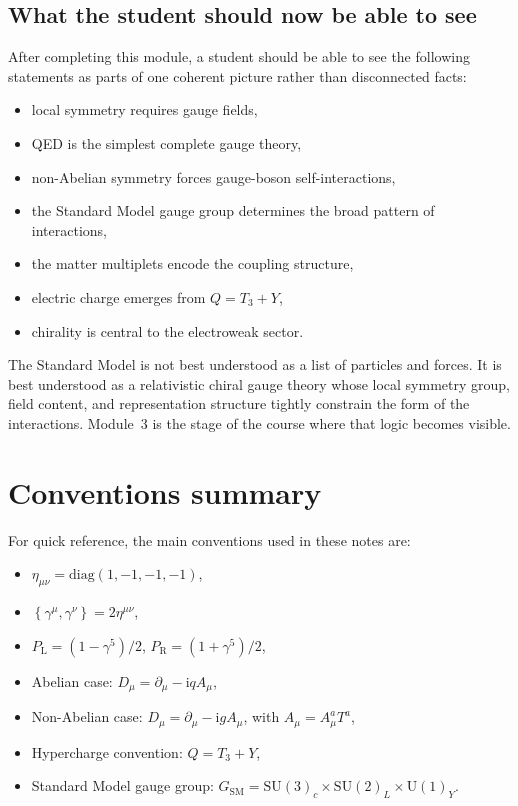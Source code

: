 \documentclass[11pt,a4paper]{article}
\newcommand{\ii}{\mathrm{i}}
\newcommand{\p}{\partial}
\newcommand{\diag}{\mathrm{diag}}
\newcommand{\acomm}[2]{\left\{#1,#2\right\}}
\newcommand{\PL}{P_{\mathrm{L}}}
\newcommand{\PR}{P_{\mathrm{R}}}
\newcommand{\SMgauge}{\mathrm{SU}(3)_c \times \mathrm{SU}(2)_L \times \mathrm{U}(1)_Y}
\begin{document}
\subsection{What the student should now be able to see}

After completing this module, a student should be able to see the following statements as parts of one coherent picture rather than disconnected facts:
\begin{itemize}[leftmargin=1.7em]
    \item local symmetry requires gauge fields,
    \item QED is the simplest complete gauge theory,
    \item non-Abelian symmetry forces gauge-boson self-interactions,
    \item the Standard Model gauge group determines the broad pattern of interactions,
    \item the matter multiplets encode the coupling structure,
    \item electric charge emerges from \(Q=T_3+Y\),
    \item chirality is central to the electroweak sector.
\end{itemize}

\begin{takehomebox}
\vspace{0.25cm}
The Standard Model is not best understood as a list of particles and forces. It is best understood as a relativistic chiral gauge theory whose local symmetry group, field content, and representation structure tightly constrain the form of the interactions. Module~3 is the stage of the course where that logic becomes visible.
\end{takehomebox}

\appendix




\section{Conventions summary}

For quick reference, the main conventions used in these notes are:
\begin{itemize}[leftmargin=1.7em]
\item \(\eta_{\mu\nu}=\diag(1,-1,-1,-1)\),
\item \(\acomm{\gamma^\mu}{\gamma^\nu}=2\eta^{\mu\nu}\),
\item \(\PL=(1-\gamma^5)/2\), \(\PR=(1+\gamma^5)/2\),
\item Abelian case: \(D_\mu=\p_\mu-\ii q A_\mu\),
\item Non-Abelian case: \(D_\mu=\p_\mu-\ii g A_\mu\), with \(A_\mu=A_\mu^aT^a\),
\item Hypercharge convention: \(Q=T_3+Y\),
\item Standard Model gauge group: {\color{red}\(G_{\text{SM}}=\SMgauge\)}.
\end{itemize}
\end{document}

